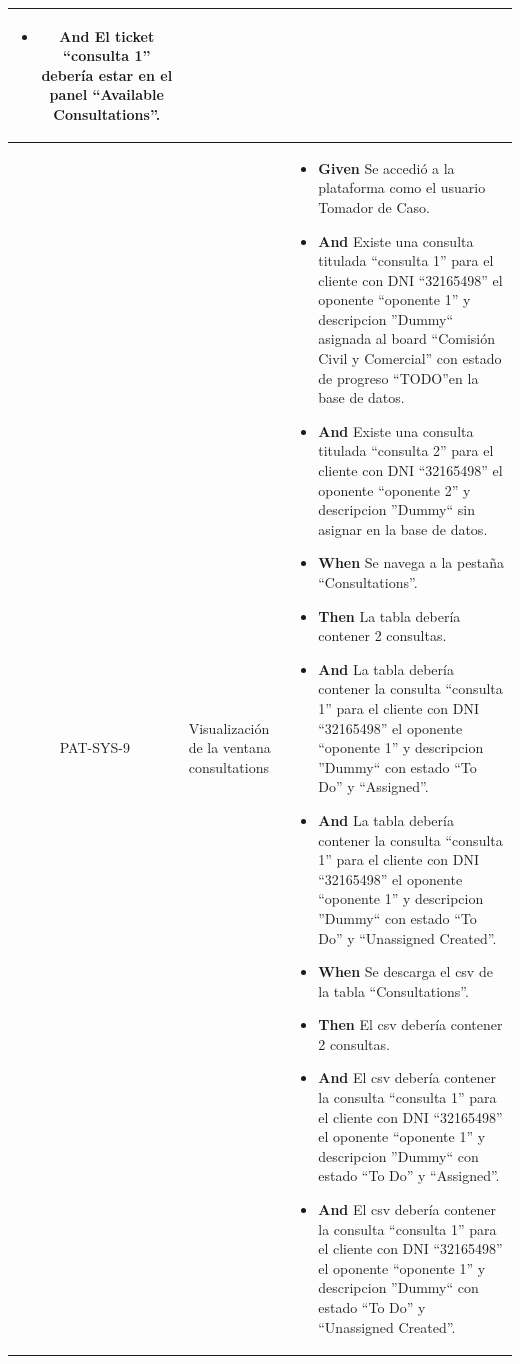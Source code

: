 \begin{longtable}{|c|p{2.5cm}|p{10.5cm}|}
\begin{itemize}
        \item \textbf{And} El ticket ``consulta 1'' debería estar en el panel ``Available Consultations''.
    \end{itemize}
    \\
    \hline
     PAT-SYS-9 & Visualización de la ventana consultations &
    \begin{itemize}
        \item \textbf{Given} Se accedió a la plataforma como el usuario Tomador de Caso.
        \item \textbf{And} Existe una consulta titulada ``consulta 1'' para el cliente con DNI ``32165498'' el oponente ``oponente 1'' y descripcion ''Dummy`` asignada al board ``Comisión Civil y Comercial'' con estado de progreso ``TODO''en la base de datos.
        \item \textbf{And} Existe una consulta titulada ``consulta 2'' para el cliente con DNI ``32165498'' el oponente ``oponente 2'' y descripcion ''Dummy`` sin asignar en la base de datos.
        \newline
        \item \textbf{When} Se navega a la pestaña ``Consultations''.
        \item \textbf{Then} La tabla debería contener 2 consultas.
        \item \textbf{And} La tabla debería contener la consulta ``consulta 1'' para el cliente con DNI ``32165498'' el oponente ``oponente 1'' y descripcion ''Dummy`` con estado ``To Do'' y ``Assigned''.
        \item \textbf{And} La tabla debería contener la consulta ``consulta 1'' para el cliente con DNI ``32165498'' el oponente ``oponente 1'' y descripcion ''Dummy`` con estado ``To Do'' y ``Unassigned Created''.
        \newline
        \item \textbf{When} Se descarga el csv de la tabla ``Consultations''.
        \item \textbf{Then} El csv debería contener 2 consultas.
        \item \textbf{And} El csv debería contener la consulta ``consulta 1'' para el cliente con DNI ``32165498'' el oponente ``oponente 1'' y descripcion ''Dummy`` con estado ``To Do'' y ``Assigned''.
        \item \textbf{And} El csv debería contener la consulta ``consulta 1'' para el cliente con DNI ``32165498'' el oponente ``oponente 1'' y descripcion ''Dummy`` con estado ``To Do'' y ``Unassigned Created''.
        \newline

\end{itemize}
\end{longtable}
